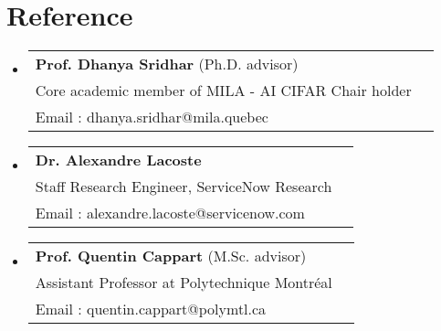 \documentclass[letterpaper,11pt]{article}
\makeatletter
\newcommand{\resumeProjectHeading}[2]{
    \item
    \begin{tabular*}{0.97\textwidth}{l@{\extracolsep{\fill}}r}
      \small#1 & #2 \\
    \end{tabular*}\vspace{-7pt}
}
\newcommand{\resumeSubHeadingListStart}{\begin{itemize}[leftmargin=0.15in, label={}]}
\newcommand{\resumeSubHeadingListEnd}{\end{itemize}}
\makeatother
\begin{document}
\section{Reference}
 \resumeSubHeadingListStart
       \resumeProjectHeading
          {\textbf{Prof. Dhanya Sridhar}  (Ph.D. advisor)
            \\ Core academic member of MILA - AI CIFAR Chair holder 
            \\ Email : dhanya.sridhar@mila.quebec}{}
       \resumeProjectHeading
          {\textbf{Dr. Alexandre Lacoste}
            \\ Staff Research Engineer, ServiceNow Research
            \\ Email : alexandre.lacoste@servicenow.com }{}
       \resumeProjectHeading
          {\textbf{Prof. Quentin Cappart}  (M.Sc. advisor)
\\ Assistant Professor at Polytechnique Montréal 
\\ Email : quentin.cappart@polymtl.ca }{}
    \resumeSubHeadingListEnd
\end{document}

